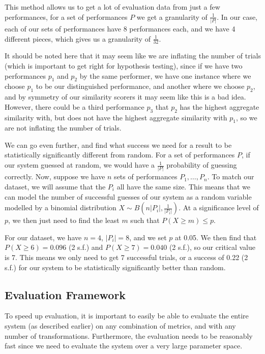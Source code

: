 \documentclass[oneside, class=book, 12pt, crop=false]{standalone}
\begin{document}
This method allows us to get a lot of evaluation data from just a few performances, for a set of performances $P$ we get a granularity of $\frac{1}{|P|}$. In our case, each of our sets of performances have 8 performances each, and we have 4 different pieces, which gives us a granularity of $\frac{1}{32}$.

It should be noted here that it may seem like we are inflating the number of trials (which is important to get right for hypothesis testing), since if we have two performances $p_1$ and $p_2$ by the same performer, we have one instance where we choose $p_1$ to be our distinguished performance, and another where we choose $p_2$, and by symmetry of our similarity scorers it may seem like this is a bad idea. However, there could be a third performance $p_3$ that $p_2$ has the highest aggregate similarity with, but does not have the highest aggregate similarity with $p_1$, so we are not inflating the number of trials.


We can go even further, and find what success we need for a result to be statistically significantly different from random. For a set of performances $P$, if our system guessed at random, we would have a $\frac{1}{|P|}$ probability of guessing correctly. Now, suppose we have $n$ sets of performances $P_1, \ldots, P_n$. To match our dataset, we will assume that the $P_i$ all have the same size. This means that we can model the number of successful guesses of our system as a random variable modelled by a binomial distribution $X \sim B(n|P_i|, \frac{1}{|P_i|})$. At a significance level of $p$, we then just need to find the least $m$ such that $P(X \geq m) \leq p$.

For our dataset, we have $n=4$, $|P_i| = 8$, and we set $p$ at 0.05. We then find that $P(X \geq 6) = 0.096$ (2 s.f.) and $P(X \geq 7) = 0.040$ (2 s.f.), so our critical value is 7. This means we only need to get 7 successful trials, or a success of 0.22 (2 s.f.) for our system to be statistically significantly better than random.

\subsection{Evaluation Framework}\label{sec:evaluation framework}

To speed up evaluation, it is important to easily be able to evaluate the entire system (as described earlier) on any combination of metrics, and with any number of transformations. Furthermore, the evaluation needs to be reasonably fast since we need to evaluate the system over a very large parameter space.
\end{document}
